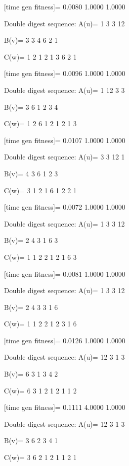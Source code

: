 [time gen fitness]=
    0.0080    1.0000    1.0000

Double digest sequence:
A(u)=
     1     3     3    12

B(v)=
     3     3     4     6     2     1

C(w)=
     1     2     1     2     1     3     6     2     1

[time gen fitness]=
    0.0096    1.0000    1.0000

Double digest sequence:
A(u)=
     1    12     3     3

B(v)=
     3     6     1     2     3     4

C(w)=
     1     2     6     1     2     1     2     1     3

[time gen fitness]=
    0.0107    1.0000    1.0000

Double digest sequence:
A(u)=
     3     3    12     1

B(v)=
     4     3     6     1     2     3

C(w)=
     3     1     2     1     6     1     2     2     1

[time gen fitness]=
    0.0072    1.0000    1.0000

Double digest sequence:
A(u)=
     1     3     3    12

B(v)=
     2     4     3     1     6     3

C(w)=
     1     1     2     2     1     2     1     6     3

[time gen fitness]=
    0.0081    1.0000    1.0000

Double digest sequence:
A(u)=
     1     3     3    12

B(v)=
     2     4     3     3     1     6

C(w)=
     1     1     2     2     1     2     3     1     6

[time gen fitness]=
    0.0126    1.0000    1.0000

Double digest sequence:
A(u)=
    12     3     1     3

B(v)=
     6     3     1     3     4     2

C(w)=
     6     3     1     2     1     2     1     1     2

[time gen fitness]=
    0.1111    4.0000    1.0000

Double digest sequence:
A(u)=
    12     3     1     3

B(v)=
     3     6     2     3     4     1

C(w)=
     3     6     2     1     2     1     1     2     1

